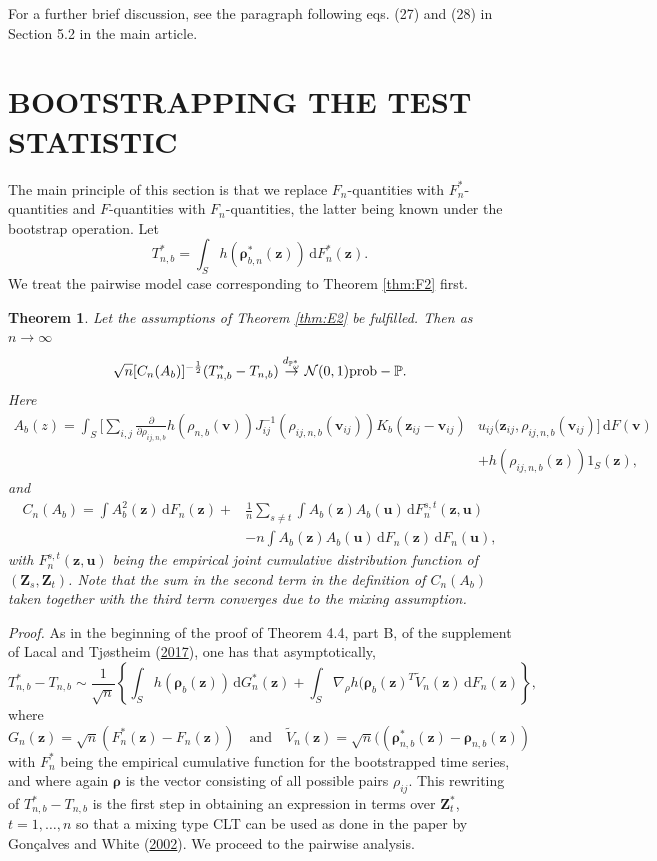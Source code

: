\documentclass[
  12pt,
  letterpaper]{article}
\newtheorem{thm}{Theorem}[section]
\numberwithin{equation}{section}
\newcommand{\Z}{\bm{Z}}
\newcommand{\z}{\bm{z}}
\newcommand{\fv}{\bm{v}}
\newcommand{\fu}{\bm{u}}
\newcommand{\frho}{\bm{\rho}}
\newcommand{\di}{\,\textrm{d}}
\begin{document}
For a further brief discussion, see the paragraph following eqs. (27) and (28) in Section 5.2 in the main article.

\hypertarget{boot-test}{%
\section{BOOTSTRAPPING THE TEST STATISTIC}\label{boot-test}}

The main principle of this section is that we replace \(F_n\)-quantities with \(F_n^{*}\)-quantities and \(F\)-quantities with \(F_n\)-quantities, the latter being known under the bootstrap operation. Let
\[T_{n,b}^* = \int_S h(\frho_{b,n}^*(\z))\di F_n^*(\z).\]
We treat the pairwise model case corresponding to Theorem \ref{thm:F2} first.

\begin{thm}
Let the assumptions of Theorem \ref{thm:E2} be fulfilled. Then
as $n \to \infty$
$$
\sqrt{n}[C_{n}(A_b)]^{-\frac{1}{2}}(T_{n,b}^* - T_{n,b}) \stackrel{d_{\mathbb{P}_{\omega}^{*}}}{\to} {\cal N}(0,1) \mbox{prob}-\mathbb{P}.
$$
Here 
\begin{align*}
A_b(z) = \int_{S} \Big[\sum_{i,j}\frac{\partial}{\partial \rho_{ij,n,b}} h(\rho_{n,b}(\fv))J_{ij}^{-1}(\rho_{ij,n,b}(\fv_{ij}))K_b(\z_{ij}-\fv_{ij})&u_{ij}(\z_{ij},\rho_{ij,n,b}(\fv_{ij})\Big]  \di F(\fv) \\
& + h(\rho_{ij,n,b}(\z))1_S(\z),
\end{align*}
and 
\begin{align}
C_n(A_b) = \int A_b^2(\z)\di F_n(\z) + & \frac{1}{n}\sum_{s \neq t}\int A_b(\z)A_b(\fu)\di F^{s,t}_{n}(\z,\fu) \nonumber \\
& -  n\int A_b(\z)A_b(\fu) \di F_n(\z) \di F_n(\fu), 
\label{eq:t00}
\end{align}
with $F^{s,t}_{n}(\z,\fu)$ being the empirical joint cumulative distribution function of $(\Z_s,\Z_t)$. Note that the sum in the second term in the definition of $C_n(A_b)$ taken together with the third term converges due to the mixing assumption.
\label{thm:H1}
\end{thm}

\emph{Proof.} As in the beginning of the proof of Theorem 4.4, part B, of the supplement of Lacal and Tjøstheim (\protect\hyperlink{ref-lacal2017local}{2017}), one has that asymptotically,
\begin{equation}
T_{n,b}^* - T_{n,b}  \sim \frac{1}{\sqrt{n}} \left\{\int_S h(\frho_b(\z)) \di G_n^*(\z) + \int_S\nabla_{\rho}h(\frho_b(\z)^{T}\tilde{V}_n(\z) \di F_n(\z)\right\},
\label{eq:t11}
\end{equation}
where
\[
G_n(\z) = \sqrt{n}(F_n^*(\z) - F_n(\z)) \quad \mbox{and} \quad \tilde{V}_n(\z) = \sqrt{n}((\frho_{n,b}^{*}(\z) -\frho_{n,b}(\z))
\]
with \(F_n^*\) being the empirical cumulative function for the bootstrapped time series, and where again \(\frho\) is the vector consisting of all possible pairs \(\rho_{ij}\). This rewriting of \(T_{n,b}^*-T_{n,b}\) is the first step in obtaining an expression in terms over \(\Z^*_t\), \(t=1,\dots,n\) so that a mixing type CLT can be used as done in the paper by Gonçalves and White (\protect\hyperlink{ref-gonccalves2002bootstrap}{2002}). We proceed to the pairwise analysis.
\end{document}
